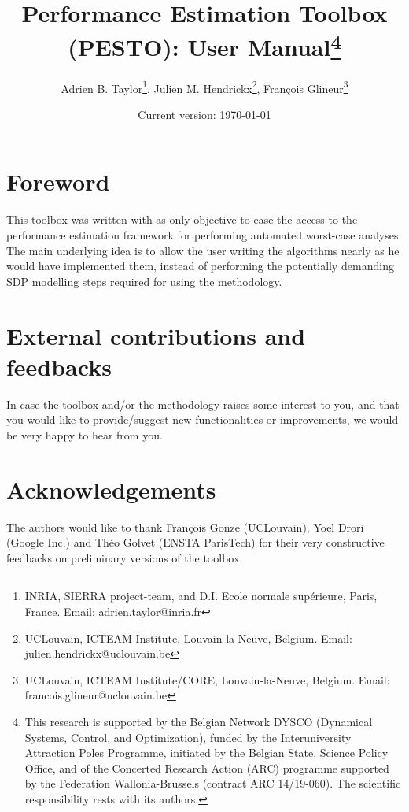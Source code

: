 \documentclass[11pt,a4paper]{article}
\begin{document}
\author{Adrien B. Taylor\footnote{INRIA, SIERRA project-team, and D.I. Ecole normale sup\'erieure, Paris, France. Email: adrien.taylor@inria.fr}, Julien M. Hendrickx\footnote{UCLouvain, ICTEAM Institute, Louvain-la-Neuve, Belgium. Email:
		julien.hendrickx@uclouvain.be}, Fran\c{c}ois Glineur\footnote{UCLouvain, ICTEAM Institute/CORE, Louvain-la-Neuve, Belgium. Email: francois.glineur@uclouvain.be}}
\title{Performance Estimation Toolbox (PESTO): User Manual\thanks{This research is supported by the Belgian Network DYSCO (Dynamical Systems, Control, and Optimization), funded by the Interuniversity Attraction Poles Programme, initiated by the Belgian State, Science Policy Office, and of the Concerted Research Action (ARC) programme supported by the Federation Wallonia-Brussels (contract ARC 14/19-060). The scientific responsibility rests with its authors.}}
\date{Current version: \today}
\maketitle

\renewcommand*\contentsname{}
\setcounter{tocdepth}{2} \tableofcontents

\clearpage
\section*{Foreword}
This toolbox was written with as only objective to ease the access to the performance estimation framework for performing automated worst-case analyses. The main underlying idea is to allow the user writing the algorithms nearly as he would have implemented them, instead of performing the potentially demanding SDP modelling steps required for using the methodology.

\section*{External contributions and feedbacks}
In case the toolbox and/or the methodology raises some interest to you, and that you would like to provide/suggest new functionalities or improvements, we would be very happy to hear from you.

\section*{Acknowledgements}
The authors would like to thank Fran\c{c}ois Gonze (UCLouvain), Yoel Drori (Google Inc.) and Th\'eo Golvet (ENSTA ParisTech) for their very constructive feedbacks on preliminary versions of the toolbox.
\end{document}
